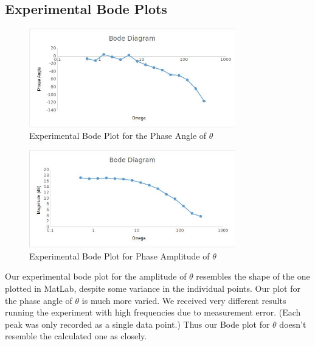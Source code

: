 \subsection{Experimental Bode Plots}

\begin{figure}[H]
	\centering
	\includegraphics[width=0.8\textwidth]{./figures/lab2_experiment_phase.jpg}
	\caption{Experimental Bode Plot for the Phase Angle of $\theta$}
	\label{fig:}
\end{figure}

\begin{figure}[H]
	\centering
	\includegraphics[width=0.8\textwidth]{./figures/lab2_experiment_magnitude.jpg}
	\caption{Experimental Bode Plot for Phase Amplitude of $\theta$}
	\label{fig:}
\end{figure}

Our experimental bode plot for the amplitude of $\theta$ resembles the shape of the one plotted in MatLab, despite some variance in the individual points. Our plot for the phase angle of $\theta$ is much more varied. We received very different results running the experiment with high frequencies due to measurement error. (Each peak was only recorded as a single data point.) Thus our Bode plot for $\theta$ doesn't resemble the calculated one as closely.
